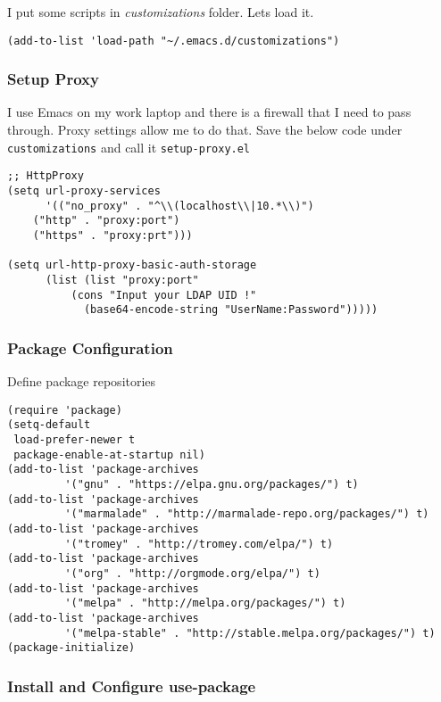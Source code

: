 \documentclass[11pt]{article}
\begin{document}
I put some scripts in \emph{customizations} folder. Lets load it. 

\begin{verbatim}
(add-to-list 'load-path "~/.emacs.d/customizations")
\end{verbatim}

\subsubsection{Setup Proxy}
\label{sec:org7c1b370}
I use Emacs on my work laptop and there is a firewall that I need to pass through. Proxy settings allow me to do that. Save the below code under \texttt{customizations} and call it \texttt{setup-proxy.el}
\begin{verbatim}
;; HttpProxy
(setq url-proxy-services
      '(("no_proxy" . "^\\(localhost\\|10.*\\)")
	("http" . "proxy:port")
	("https" . "proxy:prt")))

(setq url-http-proxy-basic-auth-storage
      (list (list "proxy:port"
		  (cons "Input your LDAP UID !"
			(base64-encode-string "UserName:Password")))))
\end{verbatim}

\subsubsection{Package Configuration}
\label{sec:org2dfdaec}

Define package repositories

\begin{verbatim}
(require 'package)
(setq-default
 load-prefer-newer t
 package-enable-at-startup nil)
(add-to-list 'package-archives
	     '("gnu" . "https://elpa.gnu.org/packages/") t)
(add-to-list 'package-archives
	     '("marmalade" . "http://marmalade-repo.org/packages/") t)
(add-to-list 'package-archives
	     '("tromey" . "http://tromey.com/elpa/") t)
(add-to-list 'package-archives
	     '("org" . "http://orgmode.org/elpa/") t)
(add-to-list 'package-archives
	     '("melpa" . "http://melpa.org/packages/") t)
(add-to-list 'package-archives
	     '("melpa-stable" . "http://stable.melpa.org/packages/") t)
(package-initialize)
\end{verbatim}

\subsubsection{Install and Configure use-package}
\label{sec:orge76701c}
\end{document}
